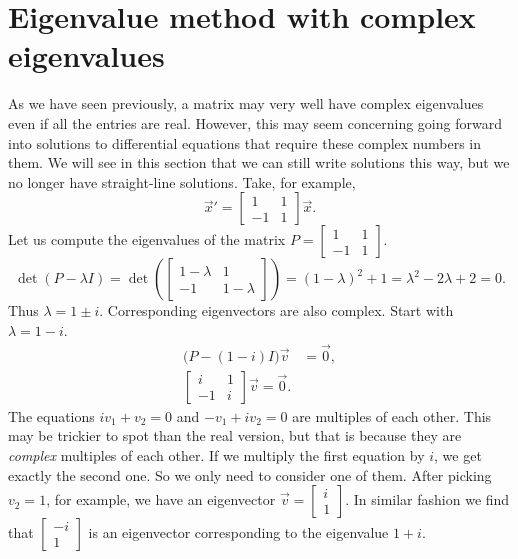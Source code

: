\section{Eigenvalue method with complex eigenvalues}
\label{eigenmethod-cplx:section}



As we have seen previously, a matrix may very well have complex eigenvalues even if all the entries are
real. However, this may seem concerning going forward into solutions to differential equations that require these complex numbers in them. We will see in this section that we can still write solutions this way, but we no longer have straight-line solutions.  Take, for example,
\begin{equation*}
{\vec{x}}' = 
\begin{bmatrix}
1 & 1 \\
-1 & 1
\end{bmatrix}
\vec{x} .
\end{equation*}
Let us compute the eigenvalues of
the matrix $P = \left[ \begin{smallmatrix} 1 & 1 \\ -1 & 1 \end{smallmatrix}
\right]$.
\begin{equation*}
\det(P - \lambda I) =
\det\left(
\begin{bmatrix}
1-\lambda & 1 \\
-1 & 1-\lambda
\end{bmatrix}
\right)
= {(1-\lambda)}^2 + 1
= \lambda^2 - 2 \lambda + 2 = 0 .
\end{equation*}
Thus $\lambda = 1 \pm i$.
Corresponding eigenvectors are also complex.
Start with $\lambda = 1-i$.
\begin{align*}
\bigl(P-(1-i) I\bigr) \vec{v} & = \vec{0} , \\
\begin{bmatrix}
i & 1 \\
-1 & i
\end{bmatrix}
\vec{v} = \vec{0}.
\end{align*}
The equations $i v_1 + v_2 = 0$ and $-v_1 + iv_2 = 0$
are multiples of each other. This may be trickier to spot than the real version, but that is because they are \emph{complex} multiples of each other. If we multiply the first equation by $i$, we get exactly the second one. So we only need to consider one of them.
After picking $v_2 = 1$, for example, we have an
eigenvector
$\vec{v} = \left[ \begin{smallmatrix} i \\ 1 \end{smallmatrix} \right]$.
In similar fashion we find that
$\left[ \begin{smallmatrix} -i \\ 1 \end{smallmatrix} \right]$
is an eigenvector corresponding to the eigenvalue $1+i$.

